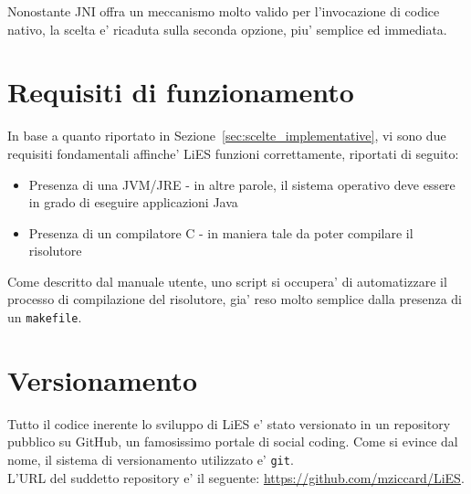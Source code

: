 \documentclass[10pt, a4paper]{article}
\begin{document}
Nonostante JNI offra un meccanismo molto valido per l'invocazione di codice nativo, la scelta e' ricaduta sulla seconda opzione, piu' semplice ed immediata.


\section{Requisiti di funzionamento}
\label{sec:requisiti_funzionamento}

In base a quanto riportato in Sezione~\ref{sec:scelte_implementative}, vi sono due requisiti fondamentali affinche' LiES funzioni correttamente, riportati di seguito:
\begin{itemize}
	\item Presenza di una JVM/JRE - in altre parole, il sistema operativo deve essere in grado di eseguire applicazioni Java
	\item Presenza di un compilatore C - in maniera tale da poter compilare il risolutore
\end{itemize}

Come descritto dal manuale utente, uno script si occupera' di automatizzare il processo di compilazione del risolutore, gia' reso molto semplice dalla presenza di un \verb+makefile+.


\section{Versionamento}
\label{sec:versionamento}

Tutto il codice inerente lo sviluppo di LiES e' stato versionato in un repository pubblico su GitHub, un famosissimo portale di social coding. Come si evince dal nome, il sistema di versionamento utilizzato e' \verb+git+.\\

L'URL del suddetto repository e' il seguente: \url{https://github.com/mziccard/LiES}.

\end{document}
